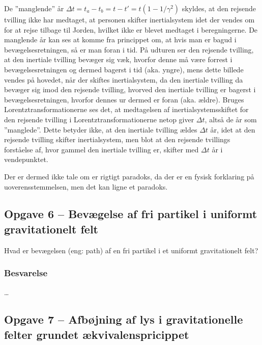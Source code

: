 \documentclass[../main.tex]{subfiles}
\begin{document}
De ''manglende'' år $\Delta t = t_a - t_b = t - t' = t (1 - 1/\gamma^2)$ skyldes, at den rejsende tvilling ikke har medtaget, at personen skifter inertialsystem idet der vendes om for at rejse tilbage til Jorden, hvilket ikke er blevet medtaget i beregningerne. De manglende år kan ses at komme fra princippet om, at hvis man er bagud i bevægelsesretningen, så er man foran i tid. På udturen ser den rejsende tvilling, at den inertiale tvilling bevæger sig væk, hvorfor denne må være forrest i bevægelsesretningen og dermed bagerst i tid (aka. yngre), mens dette billede vendes på hovedet, når der skiftes inertialsystem, da den inertiale tvilling da bevæger sig imod den rejsende tvilling, hvorved den inertiale tvilling er bagerst i bevægelsesretningen, hvorfor dennes ur dermed er foran (aka. ældre). Bruges Lorentztransformationerne ses det, at medtagelsen af inertialsystemsskiftet for den rejsende tvilling i Lorentztransformationerne netop giver $\Delta t$, altså de år som ''manglede''. Dette betyder ikke, at den inertiale tvilling ældes $\Delta t$ år, idet at den rejsende tvilling skifter inertialsystem, men blot at den rejsende tvillings forståelse af, hvor gammel den inertiale tvilling er, skifter med $\Delta t$ år i vendepunktet.

Der er dermed ikke tale om er rigtigt paradoks, da der er en fysisk forklaring på uoverensstemmelsen, men det kan ligne et paradoks.




\subsection{Opgave 6 -- Bevægelse af fri partikel i uniformt gravitationelt felt}
\setcounter{subsection}{6}
\setcounter{equation}{0}

Hvad er bevægelsen (eng: path) af en fri partikel i et uniformt gravitationelt felt?


\subsubsection{Besvarelse}

\ldots




\subsection{Opgave 7 -- Afbøjning af lys i gravitationelle felter grundet ækvivalenspricippet}
\setcounter{subsection}{7}
\setcounter{equation}{0}
\end{document}
